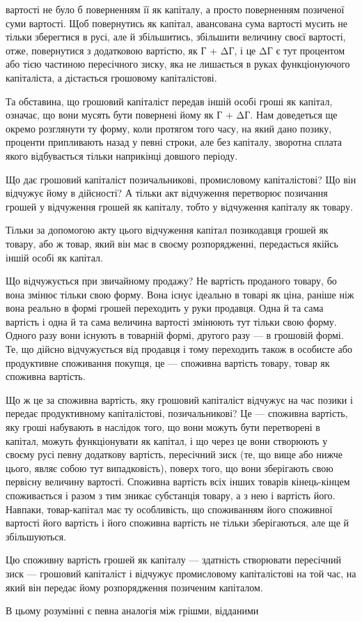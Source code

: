 вартості не було б поверненням її як капіталу, а просто поверненням
позиченої суми вартості. Щоб повернутись як капітал,
авансована сума вартості мусить не тільки зберегтися в русі,
але й збільшитись, збільшити величину своєї вартості, отже,
повернутися з додатковою вартістю, як Г + ΔГ, і це ΔГ є тут
процентом або тією частиною пересічного зиску, яка не лишається
в руках функціонуючого капіталіста, а дістається грошовому капіталістові.

Та обставина, що грошовий капіталіст передав іншій особі
гроші як капітал, означає, що вони мусять бути повернені йому
як Г + ΔГ. Нам доведеться ще окремо розглянути ту форму, коли
протягом того часу, на який дано позику, проценти припливають
назад у певні строки, але без капіталу, зворотна сплата якого
відбувається тільки наприкінці довшого періоду.

Що дає грошовий капіталіст позичальникові, промисловому
капіталістові? Що він відчужує йому в дійсності? А тільки акт
відчуження перетворює позичання грошей у відчуження грошей
як капіталу, тобто у відчуження капіталу як товару.

Тільки за допомогою акту цього відчуження капітал позикодавця
грошей як товару, або ж товар, який він має в своєму
розпорядженні, передається якійсь іншій особі як капітал.

Що відчужується при звичайному продажу? Не вартість проданого
товару, бо вона змінює тільки свою форму. Вона існує ідеально
в товарі як ціна, раніше ніж вона реально в формі грошей
переходить у руки продавця. Одна й та сама вартість і одна й та
сама величина вартості змінюють тут тільки свою форму. Одного
разу вони існують в товарній формі, другого разу — в грошовій
формі. Те, що дійсно відчужується від продавця і тому переходить
також в особисте або продуктивне споживання покупця,
це — споживна вартість товару, товар як споживна вартість.

Що ж це за споживна вартість, яку грошовий капіталіст відчужує
на час позики і передає продуктивному капіталістові,
позичальникові? Це — споживна вартість, яку гроші набувають
в наслідок того, що вони можуть бути перетворені в капітал,
можуть функціонувати як капітал, і що через це вони створюють
у своєму русі певну додаткову вартість, пересічний зиск (те,
що вище або нижче цього, являє собою тут випадковість), поверх
того, що вони зберігають свою первісну величину вартості. Споживна
вартість всіх інших товарів кінець-кінцем споживається
і разом з тим зникає субстанція товару, а з нею і вартість його.
Навпаки, товар-капітал має ту особливість, що споживанням його
споживної вартості його вартість і його споживна вартість не
тільки зберігаються, але ще й збільшуються.

Цю споживну вартість грошей як капіталу — здатність створювати
пересічний зиск — грошовий капіталіст і відчужує промисловому
капіталістові на той час, на який він передає йому
розпорядження позиченим капіталом.

В цьому розумінні є певна аналогія між грішми, відданими
